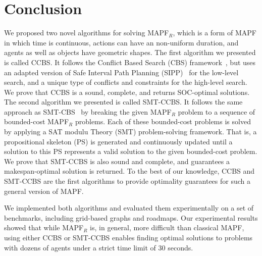 \documentclass[review]{elsarticle}
\newcommand{\smt}{\ac{SMT}\xspace}
\newcommand{\ccbs}{\ac{CCBS}\xspace}
\newcommand{\cbs}{\ac{CBS}\xspace}
\newcommand{\sipp}{\ac{SIPP}\xspace}
\newcommand{\ps}{\ac{PS}\xspace}
\newcommand{\mapfr}{\ac{MAPF}$_R$\xspace}
\newcommand{\smtcbsO}{SMT-CBS\xspace} %
\newcommand{\smtccbs}{SMT-CCBS\xspace}
\newcommand{\mapf}{\ac{MAPF}\xspace}
\begin{document}
\section{Conclusion}
\label{sec:conclusion}

We proposed two novel algorithms for solving \mapfr, which is a form of \mapf in which time is continuous, actions can have an non-uniform duration, and agents as well as objects have geometric shapes. 
The first algorithm we presented is called \ccbs. It follows the Conflict Based Search (\cbs) framework~\cite{sharon2015conflict}, but uses an adapted version of Safe Interval Path Planning (\sipp)~\cite{phillips2011sipp} for the low-level search, and a unique type of conflicts and constraints for the high-level search. 
We prove that \ccbs is a sound, complete, and returns SOC-optimal solutions. 
The second algorithm we presented is called \smtccbs. 
It follows the same approach as \smtcbsO~\cite{DBLP:conf/ijcai/Surynek19} by breaking the given \mapfr problem to a sequence of bounded-cost \mapfr problems. Each of these bounded-cost problems is solved by 
applying a SAT modulu Theory (\smt) problem-solving framework. That is, a propositional skeleton (\ps) is generated and continuously updated until a solution to this \ps represents a valid solution to the given bounded-cost problem. 
We prove that \smtccbs is also sound and complete, and guarantees a makespan-optimal solution is returned. 
To the best of our knowledge, \ccbs and \smtccbs are the first algorithms to provide optimality guarantees for such a general version of \mapf. 

We implemented both algorithms and evaluated them experimentally on a set of benchmarks, including grid-based graphs and roadmaps. Our experimental results showed that while \mapfr is, in general, more difficult than classical \mapf, using either \ccbs or \smtccbs enables finding optimal solutions to problems with dozens of agents under a strict time limit of 30 seconds. 
\end{document}

